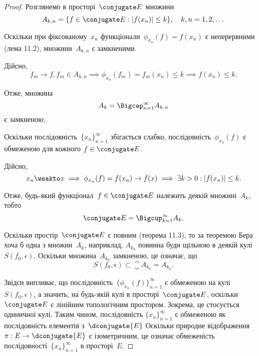 \begin{proof}
Розглянемо в просторі~$\conjugate E$ множини
\begin{equation*}
    A_{k,n} = \{f \in \conjugate E: |f(x_n)| \le k\}, \quad
    k, n = 1, 2, \dots
\end{equation*}

Оскільки при фіксованому~$x_n$ функціонали~$\phi_{x_n}(f) = f(x_n)$ є
неперервними (лема 11.2), множини~$A_{k,n}$ є замкненими.

Дійсно,
\begin{equation*}
    f_m \to f, f_m \in A_{k,n} \implies
    \phi_{x_n}(f_m) = f_m(x_n) \le k \implies
    f(x_n) \le k.
\end{equation*}

Отже, множина
\begin{equation*}
    A_k = \Bigcap_{n = 1}^\infty A_{k,n}
\end{equation*}
є замкненою.

Оскільки послідовність~$\{x_n\}_{n = 1}^\infty$
збігається слабко, послідовність~$\phi_{x_n}(f)$ є обмеженою для кожного
$f \in \conjugate E$.

Дійсно,
\begin{equation*}
    x_n \weakto x \implies
    \phi_{x_n}(f) = f(x_n) \to f(x) \implies
    \exists k > 0: |f(x_n)| \le k.
\end{equation*}

Отже, будь-який функціонал~$f \in \conjugate E$ належить деякій
множині~$A_k$, тобто
\begin{equation*}
    \conjugate E = \Bigcup_{k = 1}^\infty A_k.
\end{equation*}

Оскільки простір~$\conjugate E$ є повним (теорема 11.3), то за теоремою
Бера хоча б одна з множин~$A_k$, наприклад,
$A_{k_0}$ повинна буди
щільною в деякій кулі~$S(f_0, \epsilon)$. Оскільки множина~$A_{k_0}$
замкненою, це означає, що
\begin{equation*}
    S(f_0, \epsilon) \subset \closure A_{k_0} = A_{k_0}.
\end{equation*}

Звідси випливає, що послідовність~$\{\phi_{x_n}(f)\}_{n = 1}^\infty$
є обмеженою на кулі~$S(f_0, \epsilon)$, а значить, на будь-якій кулі в просторі~$\conjugate E$,
оскільки~$\conjugate E$ є лінійним топологічним простором. Зокрема, це
стосується одиничної кулі. Таким чином, послідовність
$\{x_n\}_{n = 1}^\infty$
є обмеженою як послідовність елементів з~$\dconjugate{E}$
Оскільки природне відображення~$\pi: E \to \dconjugate{E}$ є ізометричним,
це означає обмеженість послідовності~$\{x_n\}_{n = 1}^\infty$ в просторі~$E$.
\end{proof}

